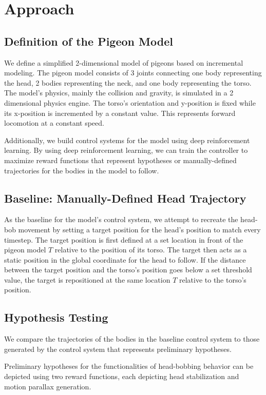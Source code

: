 \chapter{Approach}
\section{Definition of the Pigeon Model}
  We define a simplified 2-dimensional model of pigeons based on incremental modeling. The pigeon model consists of 3 joints connecting one body representing the head, 2 bodies representing the neck, and one body representing the torso. The model's physics, mainly the collision and gravity, is simulated in a 2 dimensional physics engine. The torso's orientation and y-position is fixed while its x-position is incremented by a constant value. This represents forward locomotion at a constant speed.

  Additionally, we build control systems for the model using deep reinforcement learning. By using deep reinforcement learning, we can train the controller to maximize reward functions that represent hypotheses or manually-defined trajectories for the bodies in the model to follow.

\section{Baseline: Manually-Defined Head Trajectory}
  As the baseline for the model's control system, we attempt to recreate the head-bob movement by setting a target position for the head's position to match every timestep. The target position is first defined at a set location in front of the pigeon model $T$ relative to the position of its torso. The target then acts as a static position in the global coordinate for the head to follow. If the distance between the target position and the torso's position goes below a set threshold value, the target is repositioned at the same location $T$ relative to the torso's position.

\section{Hypothesis Testing}
  We compare the trajectories of the bodies in the baseline control system to those generated by the control system that represents preliminary hypotheses.

  Preliminary hypotheses for the functionalities of head-bobbing behavior can be depicted using two reward functions, each depicting head stabilization and motion parallax generation.

